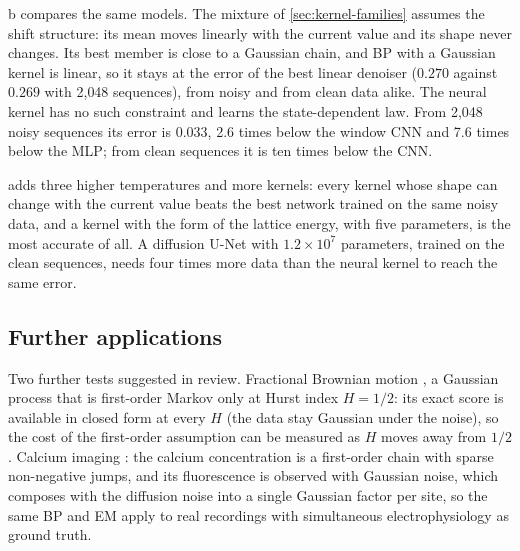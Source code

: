 \documentclass{article}
\begin{document}
b compares the same models. The mixture of \cref{sec:kernel-families} assumes the shift structure:
its mean moves linearly with the current value and its shape never changes. Its best member is close to a Gaussian
chain, and BP with a Gaussian kernel is linear, so it stays at the error of the best linear denoiser ($0.270$ against
$0.269$ with 2{,}048 sequences), from noisy and from clean data alike. The neural kernel has no such constraint and
learns the state-dependent law. From 2{,}048 noisy sequences its error is $0.033$, 2.6 times below the window CNN and
7.6 times below the MLP; from clean sequences it is ten times below the CNN.

 adds three higher temperatures and more kernels: every kernel whose shape can change with the current
value beats the best network trained on the same noisy data, and a kernel with the form of the lattice energy, with five
parameters, is the most accurate of all. A diffusion U-Net with $1.2\times10^{7}$ parameters, trained on the clean
sequences, needs four times more data than the neural kernel to reach the same error.

\subsection{Further applications}
\label{sec:more-applications}

 Two further tests suggested in review. Fractional Brownian motion \cite{mandelbrot1968fractional}, a Gaussian
process that is first-order Markov only at Hurst index $H=1/2$: its exact score is available in closed form at every $H$ (the data stay
Gaussian under the noise), so the cost of the first-order assumption can be measured as $H$ moves away from $1/2$.
Calcium imaging \cite{vogelstein2009spike,friedrich2017fast,berens2018community}: the calcium concentration is a
first-order chain with sparse non-negative jumps, and its fluorescence is observed with Gaussian noise, which composes
with the diffusion noise into a single Gaussian factor per site, so the same BP and EM apply to real recordings with
simultaneous electrophysiology as ground truth.
\end{document}
